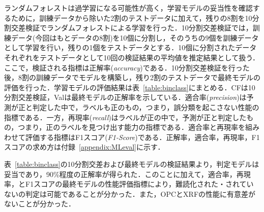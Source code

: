\documentclass[12pt]{jarticle}
\begin{document}
ランダムフォレストは過学習になる可能性が高く，学習モデルの妥当性を確認するために，訓練データから除いた2割のテストデータに加えて，残りの8割を10分割交差検証でランダムフォレストによる学習を行った．10分割交差検証では，訓練データ(今回はもとデータの8割)を10個に分割し，そのうちの9個を訓練データとして学習を行い，残りの1個をテストデータとする．10個に分割されたデータそれぞれをテストデータとして10回の検証結果の平均値を推定結果として扱う．ここで，検証される指標は正解率(\textit{accuracy})である．10分割交差検証を行った後，8割の訓練データでモデルを構築し，残り2割のテストデータで最終モデルの評価を行った．学習モデルの評価結果は表~\ref{table:binclass}にまとめる．CFは10分割交差検証，Valは最終モデルの正解率を示している．適合率(\textit{precision})は予測が正と判定した中で，ラベルも正のもの，つまり，誤分類を起こさない性能の指標である．一方，再現率(\textit{recall})はラベルが正の中で，予測が正と判定したもの，つまり，正のラベルを見つけ出す能力の指標である．適合率と再現率を組みわせて評価する指標はF1スコア(\textit{F1-Score})である．正解率，適合率，再現率，F1スコアの求め方は付録~\ref{appendix:MLeval}に示す．

表~\ref{table:binclass}の10分割交差および最終モデルの検証結果より，判定モデルは妥当であり，90\%程度の正解率が得られた．このことに加えて，適合率，再現率，とF1スコアの最終モデルの性能評価指標により，難読化された・されていないの判定は可能であることが分かった．また，OPCとXRFの性能に有意差がないことが分かった．
\end{document}
